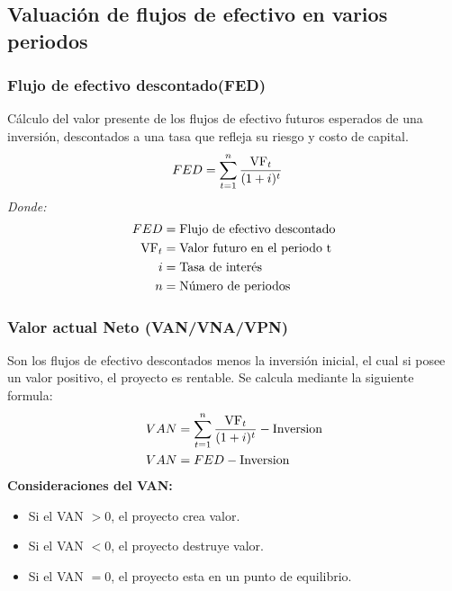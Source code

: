 \documentclass{templateNote}
\begin{document}
\subsection{Valuación de flujos de efectivo en varios periodos}
\subsubsection{Flujo de efectivo descontado(FED)} 
\noindent Cálculo del valor presente de los flujos de efectivo futuros esperados de una inversión, descontados a una tasa que refleja su riesgo y costo de capital.
\begin{align*}
    FED &= \sum_{t=1}^{n} \frac{{\textnormal{VF}}_t}{(1 + i)^t}
\end{align*}
\textit{Donde:}
\begin{align*}
    FED &= \textnormal{Flujo de efectivo descontado}\\
    \textnormal{VF}_t &= \textnormal{Valor futuro en el periodo t}\\
    i &= \textnormal{Tasa de interés}\\
    n &= \textnormal{Número de periodos}\\
\end{align*}

\subsubsection{Valor actual Neto (VAN/VNA/VPN)}
\noindent Son los flujos de efectivo descontados menos la inversión inicial, el cual si posee un valor positivo, el proyecto es rentable. Se calcula mediante la siguiente formula:
\begin{align*}
    VAN &= {\sum_{t=1}^{n} \frac{{\textnormal{VF}}_t}{(1 + i)^t}} - \textnormal{Inversion} \\
    VAN &= FED - \textnormal{Inversion}
\end{align*}
\textbf{Consideraciones del VAN:}
\begin{itemize}
    \item Si el VAN $> 0$, el proyecto crea valor.
    \item Si el VAN $< 0$, el proyecto destruye valor.
    \item Si el VAN $= 0$, el proyecto esta en un punto de equilibrio.
\end{itemize}
\end{document}
